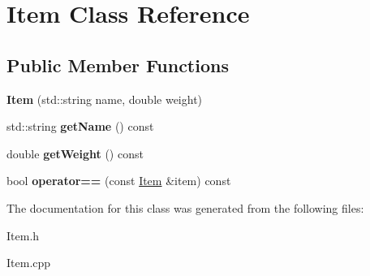 \hypertarget{class_item}{}\section{Item Class Reference}
\label{class_item}
\subsection*{Public Member Functions}
\begin{DoxyCompactItemize}
\item 
\hypertarget{class_item_a2b1b15efe37e05ef8f8dc3332b219f46}{}\label{class_item_a2b1b15efe37e05ef8f8dc3332b219f46} 
{\bfseries Item} (std\+::string name, double weight)
\item 
\hypertarget{class_item_a8d2b9d404f8e692f456af88a1eb1ce44}{}\label{class_item_a8d2b9d404f8e692f456af88a1eb1ce44} 
std\+::string {\bfseries get\+Name} () const
\item 
\hypertarget{class_item_a445196b2e8315a36ae2f2200222b0e71}{}\label{class_item_a445196b2e8315a36ae2f2200222b0e71} 
double {\bfseries get\+Weight} () const
\item 
\hypertarget{class_item_a7a9540d996d6e8e635d6648f1bfe6407}{}\label{class_item_a7a9540d996d6e8e635d6648f1bfe6407} 
bool {\bfseries operator==} (const \hyperlink{class_item}{Item} \&item) const
\end{DoxyCompactItemize}


The documentation for this class was generated from the following files\+:\begin{DoxyCompactItemize}
\item 
Item.\+h\item 
Item.\+cpp\end{DoxyCompactItemize}
